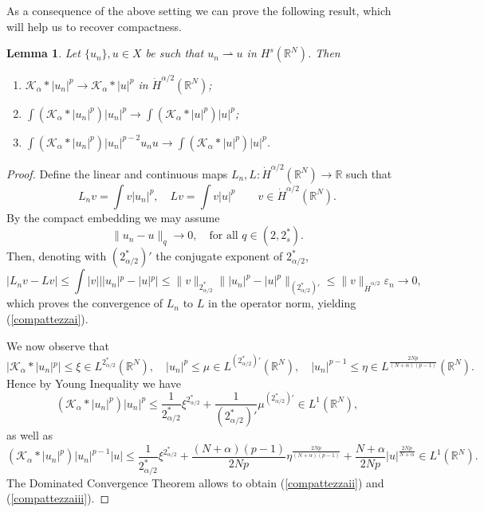 \documentclass[10pt]{amsart}
\numberwithin{equation}{section}
\newtheorem{lemma}[theorem]{Lemma}
\begin{document}
\noindent
As a consequence of the above setting
we can prove the following result, which will help us to recover compactness.
\begin{lemma}\label{compattezza}
Let $\{u_{n}\}, u \in X$ be such that $u_{n}\rightharpoonup u$  in ${H^{s}(\mathbb R^{N})}$.  Then
\begin{enumerate}[label=(\roman*),ref=\roman*]
\item \label{compattezzai}$\mathcal K_{\alpha}*|u_{n}|^{p}\to \mathcal K_{\alpha}*|u|^{p}$ in $\dot{H}^{\alpha/2}(\mathbb R^{N})$;
\item \label{compattezzaii}$\int (\mathcal K_{\alpha}*|u_{n}|^{p})|u_{n}|^{p}\to \int (\mathcal K_{\alpha}*|u|^{p})|u|^{p}$; 
\item \label{compattezzaiii}$\int (\mathcal K_{\alpha}*|u_{n}|^{p})|u_{n}|^{p-2}u_{n}u\to \int (\mathcal K_{\alpha}*|u|^{p})|u|^{p}$. 
\end{enumerate}
\end{lemma}
\begin{proof}
Define the  linear and continuous maps $L_{n}, L: \dot{H}^{\alpha/2}(\mathbb R^{N})\to \mathbb R$ such that
$$
L_{n}v=\int v|u_{n}|^{p}, \quad Lv=\int v|u|^{p}\qquad v\in \dot{H}^{\alpha/2}(\mathbb R^{N}).
$$
By the compact embedding we may assume 
\begin{equation*} 
\|u_{n}-u\|_{q}\to 0, \quad \text{for all $q\in (2,2^{*}_{s})$}.
\end{equation*}
Then, denoting with $(2^{*}_{\alpha/2})'$ the conjugate exponent of $2^{*}_{\alpha/2}$,
$$
|L_{n}v-Lv|\leq \int |v|||u_{n}|^{p}- |u|^{p}|\leq \|v\|_{2^{*}_{\alpha/2}}\||u_{n}|^{p}- |u|^{p}\|_{(2^{*}_{\alpha/2})'}
\leq \|v\|_{\dot{H}^{\alpha/2}}\varepsilon_{n}
\to 0,
$$
which proves the convergence of $L_{n}$ to $L$ in the operator norm, 
yielding (\ref{compattezzai}).

We now observe that 
$$
|\mathcal K_{\alpha}* |u_{n}|^{p}|\leq \xi\in  L^{2_{\alpha/2}^{*}}(\mathbb R^{N}),\quad 
|u_n|^p\leq\mu \in L^{(2^*_{\alpha/2})'}({{\mathbb R}}^N),\quad 
|u_{n}|^{p-1}\leq \eta\in L^{\frac{2Np}{(N+\alpha)(p-1)}}(\mathbb R^{N}).
$$
Hence
by Young Inequality we have 
$$
(\mathcal K_{\alpha}*|u_{n}|^{p})|u_{n}|^{p}\leq 
\frac{1}{2^{*}_{\alpha/2}}\xi^{2^{*}_{\alpha/2}}+
\frac{1}{(2^{*}_{\alpha/2})'}\mu^{(2^{*}_{\alpha/2})'}\in L^1({{\mathbb R}}^N),
$$
as well as
$$ (\mathcal K_{\alpha}*|u_{n}|^{p}) |u_{n}|^{p-1}|u|\leq \frac{1}{2^{*}_{\alpha/2}}\xi^{2^{*}_{\alpha/2}}
+\frac{(N+\alpha)(p-1)}{2Np} \eta^{\frac{2Np}{(N+\alpha)(p-1)}} +\frac{N+\alpha}{2Np}|u|^{\frac{2Np}{N+\alpha}}\in L^{1}(\mathbb R^{N}).$$
The Dominated Convergence Theorem allows to obtain (\ref{compattezzaii}) and (\ref{compattezzaiii}).
\end{proof} 
\end{document}
